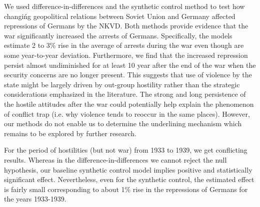 We used difference-in-differences and the synthetic control method to test how changińg geopolitical relations between Soviet Union and Germany  affected repressions of Germans by the NKVD. 
Both methods provide evidence that the war significantly increased the arrests of Germans.
Specifically, the models estimate 2 to 3\% rise in the average of arrests during the war even though are some year-to-year deviation. 
Furthermore, we find that the increased repression persist almost undiminished for at least 10 year after the end of the war when the security concerns are no longer present.
This  suggests that use of violence by the state might be largely driven by out-group 
hostility rather than the strategic considerations emphasized in the literature. 
The strong and long persistence of the hostile attitudes after the war could potentially help explain the phenomenon of conflict trap (i.e. why violence tends to reoccur in the same places). 
However, our methods do not enable us to determine the underlining mechanism which remains to be explored by further research. 

For the period of hostilities (but not war) from 1933 to 1939, we get conflicting results. Whereas in the difference-in-differences we cannot reject the null hypothesis, our baseline synthetic control model implies positive and statistically significant effect. Nevertheless, even for the synthetic control, the estimated effect is fairly small corresponding to about 1\% rise in the repressions of Germans for the years 1933-1939.



